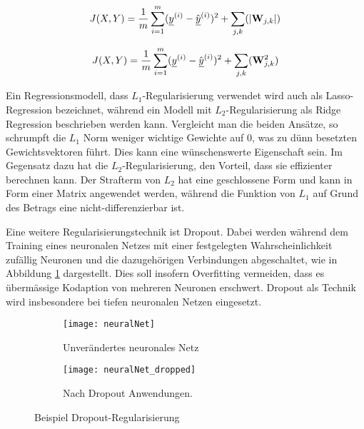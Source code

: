 \begin{equation} \label{eqn:MSE-L1}
	J(X, Y) = \frac{1}{m} \sum_{i=1}^{m} ({\underline{y}}^{(i)} - \hat{{\underline{y}}}^{(i)})^2 + \sum_{j, k} (|{{\mathbf{W}}}_{j,k}|)
\end{equation} 

\begin{equation} \label{eqn:MSE-L2}
	J(X, Y) = \frac{1}{m} \sum_{i=1}^{m} ({\underline{y}}^{(i)} - \hat{{\underline{y}}}^{(i)})^2 + \sum_{j, k} ({{\mathbf{W}}}_{j,k}^2)
\end{equation} 


Ein Regressionsmodell, dass \(L_1\)-Regularisierung verwendet wird auch als Lasso-Regression bezeichnet, 
während ein Modell mit \(L_2\)-Regularisierung als Ridge Regression beschrieben werden kann.
Vergleicht man die beiden Ansätze, so schrumpft die \(L_1\) Norm weniger wichtige Gewichte auf 0, was zu dünn besetzten Gewichtsvektoren führt.
Dies kann eine wünschenswerte Eigenschaft sein.
Im Gegensatz dazu hat die \(L_2\)-Regularisierung, den Vorteil, dass sie effizienter berechnen kann.
Der Strafterm von \(L_2\) hat eine geschlossene Form und kann in Form einer Matrix angewendet werden, während die Funktion von \(L_1\) auf Grund des Betrags eine nicht-differenzierbar ist.



Eine weitere Regularisierungstechnik ist Dropout\cite{JMLR:v15:srivastava14a}.
Dabei werden während dem Training eines neuronalen Netzes 
mit einer festgelegten Wahrscheinlichkeit zufällig Neuronen und die dazugehörigen Verbindungen abgeschaltet, 
wie in Abbildung \ref{fig:dropout} dargestellt.
Dies soll insofern Overfitting vermeiden, dass es übermässige Kodaption von mehreren Neuronen erschwert.
Dropout als Technik wird insbesondere bei tiefen neuronalen Netzen eingesetzt. 

\begin{figure}[h]
    \centering
    \begin{subfigure}[t]{0.4\textwidth}
		\texttt{[image: neuralNet]}
		\caption{Unverändertes neuronales Netz}
    \end{subfigure}
    \begin{subfigure}[t]{0.4\textwidth}
		\texttt{[image: neuralNet\_dropped]}
		\caption{Nach Dropout Anwendungen.}
	\end{subfigure}
    \caption{Beispiel Dropout-Regularisierung\cite{JMLR:v15:srivastava14a}}
    \label{fig:dropout}
\end{figure}


